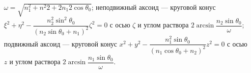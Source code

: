 $\omega=\sqrt{n^2_{1}+n^2{2}+2n_{1}{2}\cos\theta_{0}}$; неподвижный аксоид --- круговой конус
$\xi^2+\eta^2-\dfrac{n^2_{2}\sin^2\theta_{0}}{\left(n_{2}\sin\theta_{0}+n_{1}\right)^2}\zeta^2=0$ с осью $\zeta$ и углом раствора
$2\arcsin\dfrac{n_{2}\sin\theta_{0}}{\omega}$; подвижный аксоид --- круговой конус 
$x^2+y^2-\dfrac{n^2_{1}\sin\theta_{0}}{\left(n_{1}\cos\theta_{0}+n_{2}\right)^2}z^2=0$ с осью $z$ и углом раствора $2\arcsin\dfrac{n_{1}\sin\theta_{0}}{\omega}$.
